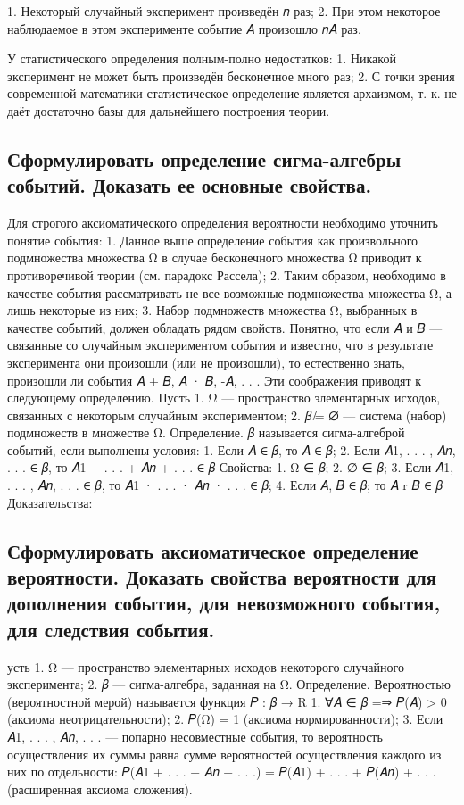 1. Некоторый случайный эксперимент произведён 𝑛 раз; 
2. При этом некоторое наблюдаемое в этом эксперименте событие 𝐴 произошло 𝑛𝐴 раз.

У статистического определения полным-полно недостатков:
1. Никакой эксперимент не может быть произведён бесконечное много раз;
2. С точки зрения современной математики статистическое определение является архаизмом, т. к. не даёт достаточно базы для дальнейшего построения теории.

\subsection{Сформулировать определение сигма-алгебры событий. Доказать ее основные свойства.}

Для строгого аксиоматического определения вероятности необходимо уточнить понятие события:
1. Данное выше определение события как произвольного подмножества множества Ω в случае бесконечного множества Ω приводит к противоречивой теории (см. парадокс Рассела); 
2. Таким образом, необходимо в качестве события рассматривать не все возможные подмножества множества Ω, а лишь некоторые из них;
3. Набор подмножеств множества Ω, выбранных в качестве событий, должен обладать рядом свойств. Понятно, что если 𝐴 и 𝐵 — связанные со случайным экспериментом события и известно, что в результате эксперимента они произошли (или не произошли), то естественно знать, произошли ли события 𝐴 + 𝐵, 𝐴 · 𝐵, -𝐴,  . . .
Эти соображения приводят к следующему определению. Пусть 
1. Ω — пространство элементарных исходов, связанных с некоторым случайным экспериментом; 
2. 𝛽 ̸= ∅ — система (набор) подмножеств в множестве Ω.
Определение. 𝛽 называется сигма-алгеброй событий, если выполнены условия: 
1. Если 𝐴 ∈ 𝛽, то 𝐴 ∈ 𝛽; 
2. Если 𝐴1, . . . , 𝐴𝑛, . . . ∈ 𝛽, то 𝐴1 + . . . + 𝐴𝑛 + . . . ∈ 𝛽
Свойства:
1. Ω ∈ 𝛽; 
2. ∅ ∈ 𝛽; 
3. Если 𝐴1, . . . , 𝐴𝑛, . . . ∈ 𝛽, то 𝐴1 · . . . · 𝐴𝑛 · . . . ∈ 𝛽; 
4. Если 𝐴, 𝐵 ∈ 𝛽; то 𝐴 r 𝐵 ∈ 𝛽
Доказательства:

\subsection{Сформулировать аксиоматическое определение вероятности. Доказать свойства вероятности для дополнения события, для невозможного события, для следствия события.}

усть 
1. Ω — пространство элементарных исходов некоторого случайного эксперимента;
2. 𝛽 — сигма-алгебра, заданная на Ω.
Определение. Вероятностью (вероятностной мерой) называется функция
𝑃 : 𝛽 → R
1. ∀𝐴 ∈ 𝛽 =⇒ 𝑃(𝐴) > 0 (аксиома неотрицательности); 
2. 𝑃(Ω) = 1 (аксиома нормированности); 
3. Если 𝐴1, . . . , 𝐴𝑛, . . . — попарно несовместные события, то вероятность осуществления их суммы равна сумме вероятностей осуществления каждого из них по отдельности: 𝑃(𝐴1 + . . . + 𝐴𝑛 + . . .) = 𝑃(𝐴1) + . . . + 𝑃(𝐴𝑛) + . . . (расширенная аксиома сложения).



